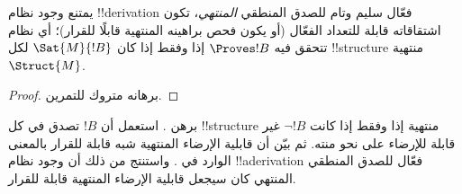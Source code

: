 \documentclass[../../../include/open-logic-section]{subfiles}
\begin{document}
\begin{cor}%
  يمتنع وجود نظام !!{derivation} فعّال سليم وتام للصدق المنطقي
  \emph{المنتهي}، تكون اشتقاقاته قابلة للتعداد الفعّال (أو يكون فحص
  براهينه المنتهية قابلًا للقرار)؛ أي نظام تتحقق فيه $\Proves !B$ إذا وفقط
  إذا كان $\Sat{M}{!B}$ لكل !!{structure} منتهية~$\Struct{M}$.
\end{cor}

\begin{proof}
  برهانه متروك للتمرين.
\end{proof}

\begin{prob}
  برهن . استعمل أن
  $!B$ تصدق في كل !!{structure} منتهية إذا وفقط إذا كانت
  $\lnot !B$ غير قابلة للإرضاء على نحو منته. ثم بيّن أن
  قابلية الإرضاء المنتهية شبه قابلة للقرار بالمعنى الوارد في
  . واستنتج من ذلك أن
  وجود نظام !!a{derivation} فعّال للصدق المنطقي المنتهي كان
  سيجعل قابلية الإرضاء المنتهية قابلة للقرار.
\end{prob}
\end{document}
